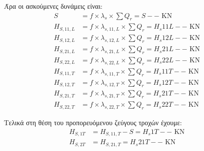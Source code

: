 Άρα οι ασκούμενες δυνάμεις είναι:
\begin{align*}
S                &= f \times \lambda_s \times \sum{Q_r} = S-- \text{ KN} \\ 
H_{S,11,L}       &= f \times \lambda_{s,11,L} \times \sum{Q_r} = H_s11L-- \text{ KN} \\ 
H_{S,12,L}       &= f \times \lambda_{s,12,L} \times \sum{Q_r} = H_s12L-- \text{ KN} \\ 
H_{S,21,L}       &= f \times \lambda_{s,21,L} \times \sum{Q_r} = H_s21L-- \text{ KN} \\ 
H_{S,22,L}       &= f \times \lambda_{s,22,L} \times \sum{Q_r} = H_s22L-- \text{ KN} \\ 
H_{S,11,T}       &= f \times \lambda_{s,11,T} \times \sum{Q_r} = H_s11T-- \text{ KN} \\ 
H_{S,12,T}       &= f \times \lambda_{s,12,T} \times \sum{Q_r} = H_s12T-- \text{ KN} \\ 
H_{S,21,T}       &= f \times \lambda_{s,21,T} \times \sum{Q_r} = H_s21T-- \text{ KN} \\ 
H_{S,22,T}       &= f \times \lambda_{s,22,T} \times \sum{Q_r} = H_s22T-- \text{ KN} 
\end{align*}

Τελικά στη θέση του προπορευόμενου ζεύγους τροχών έχουμε:
\begin{align*}
H_{S,1T} &= H_{S,11,T} - S = H_s1T-- \text{ KN} \\
H_{S,2T} &= H_{S,21,T} = H_s21T-- \text{ KN}
\end{align*}
